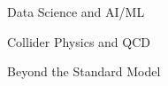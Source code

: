 \bbl
\item Data Science and AI/ML
\item Collider Physics and QCD
\item Beyond the Standard Model
\el
